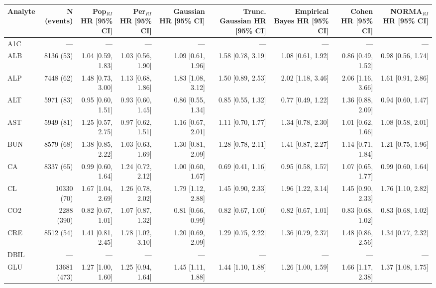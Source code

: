 \begin{table}[ht]
\centering
\footnotesize
\begin{tabular}{lrrrrrrrr}
\toprule
Analyte & N (events) & Pop$_{RI}$ HR [95\% CI] & Per$_{RI}$ HR [95\% CI] & Gaussian HR [95\% CI] & Trunc. Gaussian HR [95\% CI] & Empirical Bayes HR [95\% CI] & Cohen HR [95\% CI] & NORMA$_{RI}$ HR [95\% CI] \\
\midrule
A1C & --- & --- & --- & --- & --- & --- & --- & --- \\
ALB & 8136 (53) & 1.04 [0.59, 1.83] & 1.03 [0.56, 1.90] & 1.09 [0.61, 1.96] & 1.58 [0.78, 3.19] & 1.08 [0.61, 1.92] & 0.86 [0.49, 1.52] & 0.98 [0.56, 1.74] \\
ALP & 7448 (62) & 1.48 [0.73, 3.00] & 1.13 [0.68, 1.86] & 1.83 [1.08, 3.12] & 1.50 [0.89, 2.53] & 2.02 [1.18, 3.46] & 2.06 [1.16, 3.66] & 1.61 [0.91, 2.86] \\
ALT & 5971 (83) & 0.95 [0.60, 1.51] & 0.93 [0.60, 1.45] & 0.86 [0.55, 1.34] & 0.85 [0.55, 1.32] & 0.77 [0.49, 1.22] & 1.36 [0.88, 2.09] & 0.94 [0.60, 1.47] \\
AST & 5949 (81) & 1.25 [0.57, 2.75] & 0.97 [0.62, 1.51] & 1.16 [0.67, 2.01] & 1.11 [0.70, 1.77] & 1.34 [0.78, 2.30] & 1.01 [0.62, 1.66] & 1.08 [0.58, 2.01] \\
BUN & 8579 (68) & 1.38 [0.85, 2.22] & 1.03 [0.63, 1.69] & 1.30 [0.81, 2.09] & 1.28 [0.78, 2.11] & 1.41 [0.87, 2.27] & 1.14 [0.71, 1.84] & 1.21 [0.75, 1.96] \\
CA & 8337 (65) & 0.99 [0.60, 1.64] & 1.24 [0.72, 2.12] & 1.00 [0.60, 1.67] & 0.69 [0.41, 1.16] & 0.95 [0.58, 1.57] & 1.07 [0.65, 1.77] & 0.99 [0.60, 1.64] \\
CL & 10330 (70) & 1.67 [1.04, 2.69] & 1.26 [0.78, 2.02] & 1.79 [1.12, 2.88] & 1.45 [0.90, 2.33] & 1.96 [1.22, 3.14] & 1.45 [0.90, 2.33] & 1.76 [1.10, 2.82] \\
CO2 & 2288 (390) & 0.82 [0.67, 1.01] & 1.07 [0.87, 1.32] & 0.81 [0.66, 0.99] & 0.82 [0.67, 1.00] & 0.82 [0.67, 1.01] & 0.83 [0.68, 1.02] & 0.83 [0.68, 1.02] \\
CRE & 8512 (54) & 1.41 [0.81, 2.45] & 1.78 [1.02, 3.10] & 1.20 [0.69, 2.09] & 1.29 [0.75, 2.22] & 1.36 [0.79, 2.37] & 1.48 [0.86, 2.56] & 1.34 [0.77, 2.32] \\
DBIL & --- & --- & --- & --- & --- & --- & --- & --- \\
GLU & 13681 (473) & 1.27 [1.00, 1.60] & 1.25 [0.94, 1.64] & 1.45 [1.11, 1.88] & 1.44 [1.10, 1.88] & 1.26 [1.00, 1.59] & 1.66 [1.17, 2.38] & 1.37 [1.08, 1.75] \\

\end{tabular}
\end{table}
